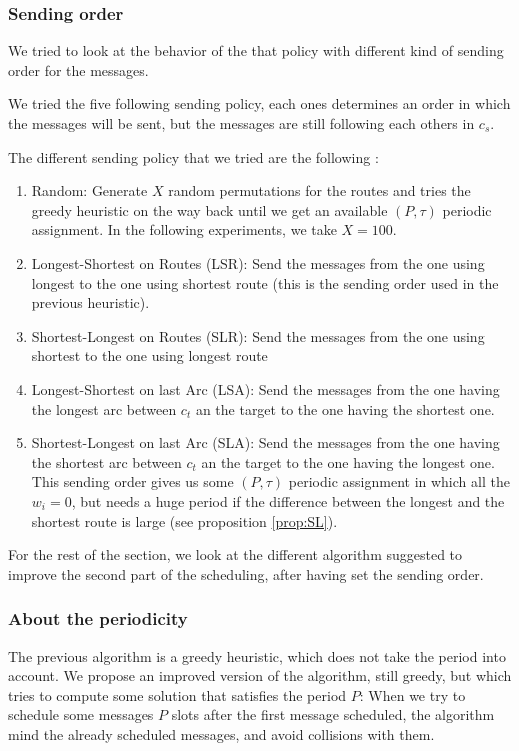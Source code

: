 \documentclass[a4paper,10pt]{article}
\begin{document}
     \subsubsection{Sending order}
     
	We tried to look at the behavior of the that policy with different kind of sending order for the messages.
	
	We tried the five following sending policy, each ones determines an order in which the messages will be sent, but the messages are still following each others in $c_s$.
	
	The different sending policy that we tried are the following :
	\begin{enumerate}
	 \item Random: Generate $X$ random permutations for the routes and tries the greedy heuristic on the way back until we get an available $(P,\tau)$ periodic assignment. In the following experiments, we take $X = 100$.
	 \item Longest-Shortest on Routes (LSR): Send the messages from the one using longest to the one using shortest route (this is the sending order used in the previous heuristic).
	 \item Shortest-Longest on Routes (SLR): Send the messages from the one using shortest to the one using longest route
	 \item Longest-Shortest on last Arc (LSA): Send the messages from the one having the longest arc between $c_t$ an the target to the one having the shortest one.
	 \item Shortest-Longest on last Arc (SLA): Send the messages from the one having the shortest arc between $c_t$ an the target to the one having the longest one. This sending order gives us some $(P,\tau)$ periodic assignment in which all the $w_i = 0$, but needs a huge period if the difference between the longest and the shortest route is large (see proposition \ref{prop:SL}).
	\end{enumerate}
	
    
     
     For the rest of the section, we look at the different algorithm suggested to improve the second part of the scheduling, after having set the sending order.
      \subsubsection{About the periodicity}
     The previous algorithm is a greedy heuristic, which does not take the period into account. 
     We propose an improved version of the algorithm, still greedy, but which tries to compute some solution that satisfies the period $P$: When we try to schedule some messages $P$ slots after the first message scheduled, the algorithm mind the already scheduled messages, and avoid collisions with them.
     
\end{document}
